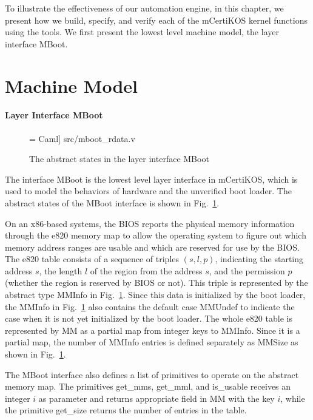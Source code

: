 To illustrate the effectiveness of our automation engine, in this chapter, we present
how we build, specify, and verify each of the mCertiKOS kernel functions using the tools.
We first present the lowest level machine model, the layer interface MBoot.

\section{Machine Model}
\paragraph{Layer Interface MBoot}

\begin{figure}
 = Caml] {src/mboot_rdata.v}
\caption{The abstract states in the layer interface MBoot}
\label{fig:ref:mboot_rdata}
\end{figure}

The interface MBoot is the lowest level layer interface in mCertiKOS, which is
used to model the behaviors of hardware and the unverified boot loader.
The abstract states of the MBoot interface is shown in Fig.~\ref{fig:ref:mboot_rdata}.

On an x86-based systems, the BIOS reports the physical memory information
through the \textsf{e820} memory map to allow the operating system to figure out
which memory address ranges are usable and which are reserved for use by the BIOS.
The \textsf{e820} table consists of a sequence of triples $(s, l, p)$, indicating
the starting address $s$, the length $l$ of the region from the address $s$, and
the permission $p$ (whether the region is reserved by BIOS or not). This triple
is represented by the abstract type \textsf{MMInfo} in Fig.~\ref{fig:ref:mboot_rdata}.
Since this data is initialized by the boot loader, the
\textsf{MMInfo} in Fig.~\ref{fig:ref:mboot_rdata} also contains the default case
\textsf{MMUndef} to indicate the case when it is not yet initialized by the boot loader.
The whole \textsf{e820} table is represented by \textsf{MM} as a partial map
from integer keys to \textsf{MMInfo}. Since it is a partial map, the number of
\textsf{MMInfo} entries is defined separately as \textsf{MMSize} as shown in
Fig.~\ref{fig:ref:mboot_rdata}.

The MBoot interface also defines a list of primitives to operate on the abstract
memory map. The primitives \textsf{get\_mms}, \textsf{get\_mml}, and \textsf{is\_usable}
receives an integer $i$ as parameter and returns appropriate field in \textsf{MM}
with the key $i$, while the primitive \textsf{get\_size} returns the number of
entries in the table.

